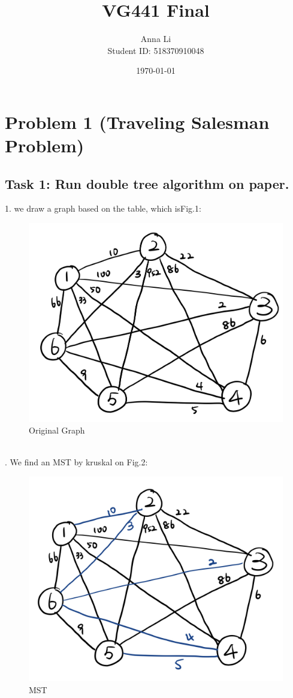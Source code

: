 \documentclass[a4paper,12pt]{journal}
\title{VG441 Final}
\author{Anna Li \\Student ID: 518370910048}
\date{\today}
\begin{document}
	\maketitle
	\section*{Problem 1 (Traveling Salesman Problem)}
	\subsection*{Task 1: Run double tree algorithm on paper.}
	1. we draw a graph based on the table, which isFig.1:\\
	\begin{figure}[h]
		\includegraphics[scale=0.2]{./image/1.jpeg}
		\caption{Original Graph}
	\end{figure}\\
. We find an MST by kruskal on Fig.2:\\
	\begin{figure}[h]
		\includegraphics[scale=0.2]{./image/2.jpeg}
		\caption{MST }
	\end{figure}\\
\end{document}
